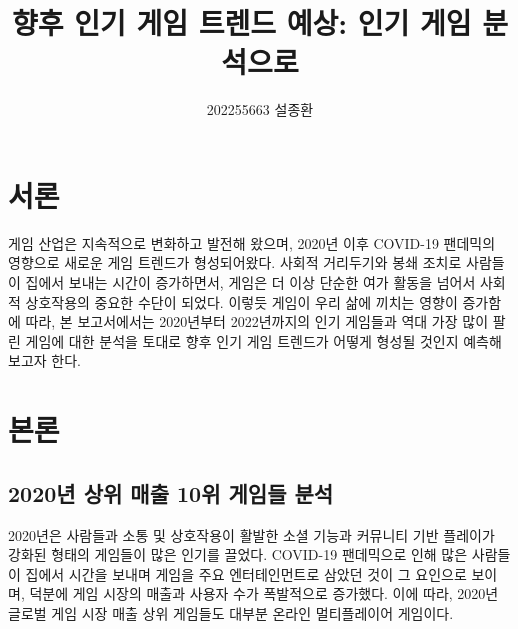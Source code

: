 \documentclass[a4paper, 11pt]{article}
\title{향후 인기 게임 트렌드 예상: 인기 게임 분석으로}
\author{202255663 설종환}
\date{}
\begin{document}
\maketitle

\section{서론}
게임 산업은 지속적으로 변화하고 발전해 왔으며, 2020년 이후 COVID-19 팬데믹의 영향으로 새로운 게임 트렌드가 형성되어왔다. 사회적 거리두기와 봉쇄 조치로 사람들이 집에서 보내는 시간이 증가하면서, 게임은 더 이상 단순한 여가 활동을 넘어서 사회적 상호작용의 중요한 수단이 되었다. 이렇듯 게임이 우리 삶에 끼치는 영향이 증가함에 따라, 본 보고서에서는 2020년부터 2022년까지의 인기 게임들과 역대 가장 많이 팔린 게임에 대한 분석을 토대로 향후 인기 게임 트렌드가 어떻게 형성될 것인지 예측해보고자 한다.

\section{본론}

\subsection{2020년 상위 매출 10위 게임들 분석}
2020년은 사람들과 소통 및 상호작용이 활발한 소셜 기능과 커뮤니티 기반 플레이가 강화된 형태의 게임들이 많은 인기를 끌었다. COVID-19 팬데믹으로 인해 많은 사람들이 집에서 시간을 보내며 게임을 주요 엔터테인먼트로 삼았던 것이 그 요인으로 보이며, 덕분에 게임 시장의 매출과 사용자 수가 폭발적으로 증가했다. 이에 따라, 2020년 글로벌 게임 시장 매출 상위 게임들도 대부분 온라인 멀티플레이어 게임이다.

\begin{table}[h!]
    \caption{2020년 상위 매출 10위 게임 \cite{2020top10}}
\end{table}
\end{document}
